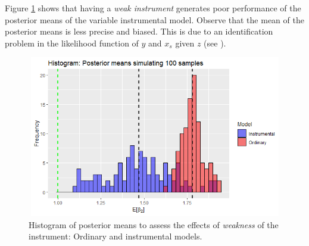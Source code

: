 \begin{enumerate}[leftmargin=*]
Figure \ref{fig71} shows that having a \textit{weak instrument} generates poor performance of the posterior means of the variable instrumental model. Observe that the mean of the posterior means is less precise and biased. This is due to an identification problem in the likelihood function of $y$ and $x_s$ given $z$ (see \cite[Chap.~7]{rossi2005bayesian}).

\begin{figure}
	\includegraphics[width=340pt, height=200pt]{Chapters/chapter7/figures/Fig71.png}
	\caption[List of figure caption goes here]{Histogram of posterior means to assess the effects of \textit{weakness} of the instrument: Ordinary and instrumental models.}\label{fig71}
\end{figure}



\end{enumerate}
